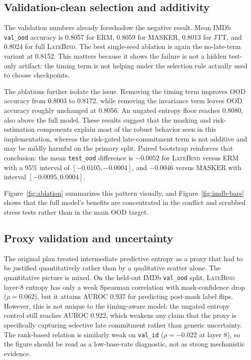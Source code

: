 \documentclass{article}
\newcommand{\LateBind}{\textsc{LateBind}}
\begin{document}
\subsection{Validation-clean selection and additivity}

The validation numbers already foreshadow the negative result. Mean IMDb \texttt{val\_ood} accuracy is 0.8057 for ERM, 0.8059 for MASKER, 0.8013 for JTT, and 0.8024 for full \LateBind. The best single-seed ablation is again the no-late-term variant at 0.8152. This matters because it shows the failure is not a hidden test-only artifact: the timing term is not helping under the selection rule actually used to choose checkpoints.

The ablations further isolate the issue. Removing the timing term improves OOD accuracy from 0.8003 to 0.8172, while removing the invariance term leaves OOD accuracy roughly unchanged at 0.8056. An ungated entropy floor reaches 0.8080, also above the full model. These results suggest that the masking and risk-estimation components explain most of the robust behavior seen in this implementation, whereas the risk-gated late-commitment term is not additive and may be mildly harmful on the primary split. Paired bootstrap reinforces that conclusion: the mean \texttt{test\_ood} difference is $-0.0052$ for \LateBind{} versus ERM with a 95\% interval of $[-0.0105, -0.0004]$, and $-0.0046$ versus MASKER with interval $[-0.0095, 0.0004]$.

Figure~\ref{fig:ablation} summarizes this pattern visually, and Figure~\ref{fig:imdb-bars} shows that the full model's benefits are concentrated in the conflict and scrubbed stress tests rather than in the main OOD target.

\subsection{Proxy validation and uncertainty}

The original plan treated intermediate predictive entropy as a proxy that had to be justified quantitatively rather than by a qualitative scatter alone. The quantitative picture is mixed. On the held-out IMDb \texttt{val\_ood} split, \LateBind{} layer-8 entropy has only a weak Spearman correlation with mask-confidence drop ($\rho = 0.062$), but it attains AUROC 0.937 for predicting post-mask label flips. However, this is not unique to the timing-aware model: the ungated entropy control still reaches AUROC 0.922, which weakens any claim that the proxy is specifically capturing selective late commitment rather than generic uncertainty. The rank-based relation is similarly weak on \texttt{val\_id} ($\rho = -0.022$ at layer 8), so the figure should be read as a low-base-rate diagnostic, not as strong mechanistic evidence.
\end{document}
